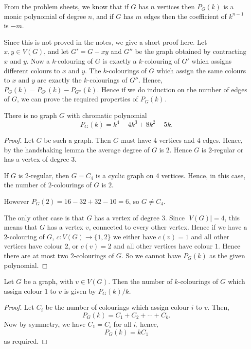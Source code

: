 \documentclass{unswmaths}
\begin{document}
From the problem sheets, we know that if $G$ has $n$ vertices then $P_G(k)$
is a monic polynomial of degree $n$, and if $G$ has $m$ edges 
then the coefficient of $k^{n-1}$ is $-m$.

Since this is not proved in the notes, we give a short proof here. 
Let $x,y \in V(G)$, and let $G' = G-xy$ and $G''$ be the graph
obtained by contracting $x$ and $y$. 
Now a $k$-colouring of $G$ is exactly a $k$-colouring
of $G'$ which assigns different colours to $x$ and $y$. 
The $k$-colourings of $G$ which assign the same colours to $x$ and $y$
are exactly the $k$-colourings of $G''$. Hence, $P_G(k) = P_{G'}(k)-P_{G''}(k)$. 
Hence if we do induction on the number of edges of $G$, we can prove the
required properties of $P_G(k)$.

\begin{lemma}[Part (a)]
    There is no graph $G$ with chromatic polynomial
    \begin{equation*}
        P_G(k) = k^4-4k^3+8k^2-5k.
    \end{equation*}
\end{lemma}
\begin{proof}
    Let $G$ be such a graph. Then $G$ must have $4$
    vertices and $4$ edges. Hence, by the handshaking
    lemma the average degree of $G$ is $2$. Hence $G$ is $2$-regular
    or has a vertex of degree $3$.
    
    If $G$ is $2$-regular, then $G = C_4$ is a cyclic graph on $4$ vertices.
    Hence, in this case, the number of $2$-colourings of $G$ is $2$.
    
    However $P_G(2) = 16-32+32-10 = 6$, so $G \neq C_4$.
    
    The only other case is that $G$ has a vertex of degree $3$. 
    Since $|V(G)| = 4$, this means that $G$ has a vertex $v$, connected to every 
    other vertex. Hence if we have a $2$-colouring of $G$, $c:V(G)\to \{1,2\}$
    we either have $c(v) = 1$ and all other vertices have colour $2$,
    or $c(v) = 2$ and all other vertices have colour $1$.
    Hence there are at most two $2$-colourings of $G$. So we cannot
    have $P_G(k)$ as the given polynomial.
\end{proof}

\begin{lemma}[Part (b)]
\label{3b}
    Let $G$ be a graph, with $v \in V(G)$. Then the number of $k$-colourings
    of $G$ which assign colour $1$ to $v$ is given by $P_G(k)/k$.
\end{lemma}
\begin{proof}
    Let $C_i$ be the number of colourings which assign colour $i$ to $v$. 
    Then, 
    \begin{equation*}
        P_G(k) = C_1+C_2+\cdots+C_k.
    \end{equation*}
    Now by symmetry, we have $C_1 = C_i$ for all $i$, hence,
    \begin{equation*}
        P_G(k) = kC_1
    \end{equation*}
    as required.
\end{proof}
\end{document}

